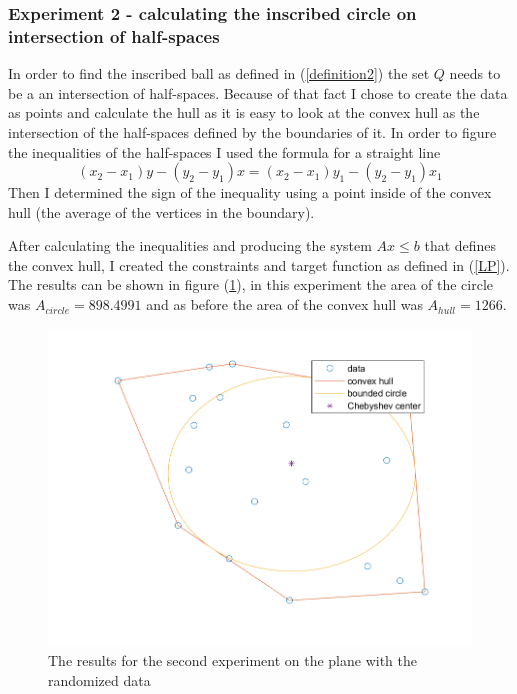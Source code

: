 \documentclass[]{article}
\newcommand{\Q}[0]{\textit{Q}}
\begin{document}
\subsubsection{Experiment 2 - calculating the inscribed circle on intersection of half-spaces}

In order to find the inscribed ball as defined in (\ref{definition2}) the set $\Q$ needs to be a an intersection of half-spaces. Because of that fact I chose to create the data as points and calculate the hull as it is easy to look at the convex hull as the intersection of the half-spaces defined by the boundaries of it. In order to figure the inequalities of the half-spaces I used the formula for a straight line \[(x_2-x_1)y - (y_2-y_1)x = (x_2-x_1)y_1 - (y_2-y_1)x_1\] Then I determined the sign of the inequality using a point inside of the convex hull (the average of the vertices in the boundary).\newline

After calculating the inequalities and producing the system $Ax \leq b$ that defines the convex hull, I created the constraints and target function as defined in (\ref{LP}). The results can be shown in figure (\ref{exp2}), in this experiment the area of the circle was $A_{circle} = 898.4991$ and as before the area of the convex hull was $A_{hull}= 1266$. 


\begin{figure}[!h]
	\centering
	\includegraphics[width=\textwidth]{bounded}
	\caption{The results for the second experiment on the plane with the randomized data}
	\label{exp2}
\end{figure}
\end{document}
